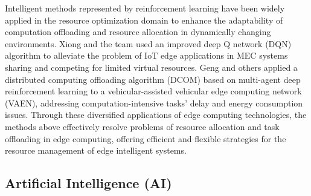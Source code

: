 \documentclass[preprint,12pt]{elsarticle}
\begin{document}
Intelligent methods represented by reinforcement learning have been widely applied in the resource optimization domain to enhance the adaptability of computation offloading and resource allocation in dynamically changing environments. Xiong and the team used an improved deep Q network (DQN) algorithm to alleviate the problem of IoT edge applications in MEC systems sharing and competing for limited virtual resources\cite{xiong2020resource}. Geng and others applied a distributed computing offloading algorithm (DCOM) based on multi-agent deep reinforcement learning to a vehicular-assisted vehicular edge computing network (VAEN), addressing computation-intensive tasks' delay and energy consumption issues\cite{geng2023deep}. Through these diversified applications of edge computing technologies, the methods above effectively resolve problems of resource allocation and task offloading in edge computing, offering efficient and flexible strategies for the resource management of edge intelligent systems.

\subsection{Artificial Intelligence (AI)}
\end{document}
